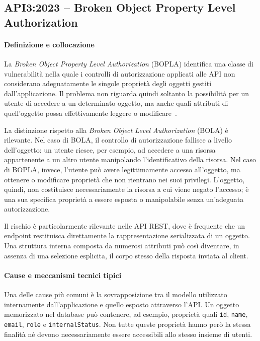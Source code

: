 \subsection{API3:2023 -- Broken Object Property Level Authorization}
\label{subsubsec:api3}

\paragraph{Definizione e collocazione}

La \textit{Broken Object Property Level Authorization} (BOPLA) identifica una classe di vulnerabilità nella quale i controlli di autorizzazione applicati alle API non considerano adeguatamente le singole proprietà degli oggetti gestiti dall'applicazione. Il problema non riguarda quindi soltanto la possibilità per un utente di accedere a un determinato oggetto, ma anche quali attributi di quell'oggetto possa effettivamente leggere o modificare~\cite{owasp2023apitop10}.

La distinzione rispetto alla \textit{Broken Object Level Authorization} (BOLA) è rilevante. Nel caso di BOLA, il controllo di autorizzazione fallisce a livello dell'oggetto: un utente riesce, per esempio, ad accedere a una risorsa appartenente a un altro utente manipolando l'identificativo della risorsa. Nel caso di BOPLA, invece, l'utente può avere legittimamente accesso all'oggetto, ma ottenere o modificare proprietà che non rientrano nei suoi privilegi. L'oggetto, quindi, non costituisce necessariamente la risorsa a cui viene negato l'accesso; è una sua specifica proprietà a essere esposta o manipolabile senza un'adeguata autorizzazione.

Il rischio è particolarmente rilevante nelle API REST, dove è frequente che un endpoint restituisca direttamente la rappresentazione serializzata di un oggetto. Una struttura interna composta da numerosi attributi può così diventare, in assenza di una selezione esplicita, il corpo stesso della risposta inviata al client.

\paragraph{Cause e meccanismi tecnici tipici}

Una delle cause più comuni è la sovrapposizione tra il modello utilizzato internamente dall'applicazione e quello esposto attraverso l'API. Un oggetto memorizzato nel database può contenere, ad esempio, proprietà quali \texttt{id}, \texttt{name}, \texttt{email}, \texttt{role} e \texttt{internalStatus}. Non tutte queste proprietà hanno però la stessa finalità né devono necessariamente essere accessibili allo stesso insieme di utenti.

